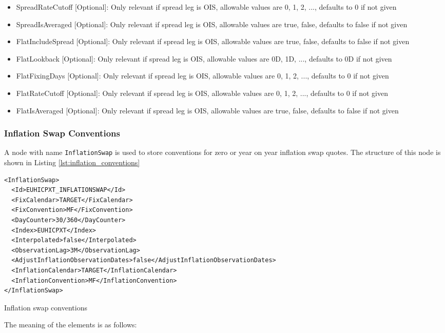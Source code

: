\begin{itemize}
\item SpreadRateCutoff [Optional]: Only relevant if spread leg is OIS, allowable values are 0, 1, 2, ..., defaults to 0 if not given
\item SpreadIsAveraged [Optional]: Only relevant if spread leg is OIS, allowable values are true, false, defaults to false if not given
\item FlatIncludeSpread [Optional]: Only relevant if spread leg is OIS, allowable values are true, false, defaults to false if not given
\item FlatLookback [Optional]: Only relevant if spread leg is OIS, allowable values are 0D, 1D, ..., defaults to 0D if not given
\item FlatFixingDays [Optional]: Only relevant if spread leg is OIS, allowable values are 0, 1, 2, ..., defaults to 0 if not given
\item FlatRateCutoff [Optional]: Only relevant if spread leg is OIS, allowable values are 0, 1, 2, ..., defaults to 0 if not given
\item FlatIsAveraged [Optional]: Only relevant if spread leg is OIS, allowable values are true, false, defaults to false if not given
\end{itemize}

\subsubsection{Inflation Swap Conventions}
A node with name \lstinline!InflationSwap! is used to store conventions for zero or year on year inflation swap quotes. The structure of this node is shown in Listing \ref{lst:inflation_conventions}

\begin{listing}[H]
\begin{verbatim}
<InflationSwap>
  <Id>EUHICPXT_INFLATIONSWAP</Id>
  <FixCalendar>TARGET</FixCalendar>
  <FixConvention>MF</FixConvention>
  <DayCounter>30/360</DayCounter>
  <Index>EUHICPXT</Index>
  <Interpolated>false</Interpolated>
  <ObservationLag>3M</ObservationLag>
  <AdjustInflationObservationDates>false</AdjustInflationObservationDates>
  <InflationCalendar>TARGET</InflationCalendar>
  <InflationConvention>MF</InflationConvention>
</InflationSwap>
\end{verbatim}
\caption{Inflation swap conventions}
\label{lst:inflation_conventions}
\end{listing}

The meaning of the elements is as follows:

